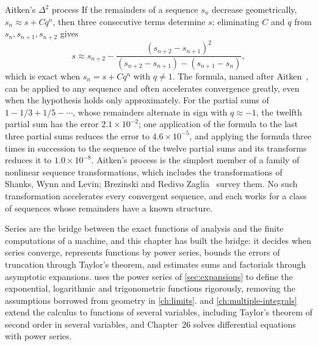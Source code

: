 \begin{note}{Aitken's \texorpdfstring{$\Delta^2$}{Delta-squared} process}
If the remainders of a sequence $s_n$ decrease geometrically, $s_n\approx s+Cq^n$, then three consecutive terms determine $s$: eliminating $C$ and $q$ from $s_n,s_{n+1},s_{n+2}$ gives
\[
s\approx s_{n+2}-\frac{(s_{n+2}-s_{n+1})^2}{(s_{n+2}-s_{n+1})-(s_{n+1}-s_n)} ,
\]
which is exact when $s_n=s+Cq^n$ with $q\ne1$. The formula, named after Aitken~\cite{aitken1926}, can be applied to any sequence and often accelerates convergence greatly, even when the hypothesis holds only approximately. For the partial sums of $1-1/3+1/5-\cdots$, whose remainders alternate in sign with $q\approx-1$, the twelfth partial sum has the error $2.1\times10^{-2}$; one application of the formula to the last three partial sums reduces the error to $4.6\times10^{-5}$, and applying the formula three times in succession to the sequence of the twelve partial sums and its transforms reduces it to $1.0\times10^{-8}$. Aitken's process is the simplest member of a family of nonlinear sequence transformations, which includes the transformations of Shanks, Wynn and Levin; Brezinski and Redivo Zaglia~\cite{brezinski1991} survey them. No such transformation accelerates every convergent sequence, and each works for a class of sequences whose remainders have a known structure.
\end{note}

\bigskip
Series are the bridge between the exact functions of analysis and the finite computations of a machine, and this chapter has built the bridge: it decides when series converge, represents functions by power series, bounds the errors of truncation through Taylor's theorem, and estimates sums and factorials through asymptotic expansions.  uses the power series of \cref{sec:expansions} to define the exponential, logarithmic and trigonometric functions rigorously, removing the assumptions borrowed from geometry in \cref{ch:limits}.  and \cref{ch:multiple-integrals} extend the calculus to functions of several variables, including Taylor's theorem of second order in several variables, and Chapter~26 solves differential equations with power series.

\chapternotes

